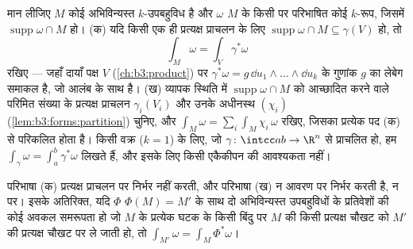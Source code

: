 \begin{definition}[किसी रूप का समाकल]\label{def:b3:forms:integral}
मान लीजिए $M$ कोई अभिविन्यस्त $k$-उपबहुविध है और $\omega$ $M$
के किसी  पर परिभाषित कोई $k$-रूप, जिसमें $\operatorname{supp}\omega \cap M$  हो।
(क) यदि किसी एक ही प्रत्यक्ष प्राचलन के लिए $\operatorname{supp}\omega \cap M \subseteq
\gamma(V)$ हो, तो
\[
\int_M\omega = \int_V\gamma^*\omega
\]
रखिए --- जहाँ दायाँ पक्ष $V$ (\cref{ch:b3:product}) पर $\gamma^*\omega = g\,\dd u_1\wedge\dots\wedge\dd u_k$ के गुणांक $g$
का लेबेग समाकल है, जो  आलंब के साथ  है।
(ख) व्यापक स्थिति में  $\operatorname{supp}\omega \cap M$ को आच्छादित करने वाले परिमित
संख्या के प्रत्यक्ष प्राचलन $\gamma_i(V_i)$ और उनके अधीनस्थ 
$(\chi_i)$ (\cref{lem:b3:forms:partition}) चुनिए, और $\int_M\omega =
\sum_i\int_M\chi_i\,\omega$ रखिए, जिसका प्रत्येक पद (क) से
परिकलित होता है। किसी वक्र ($k = 1$) के लिए, जो $\gamma\colon\intcc ab\to\R^n$ से प्राचलित
हो, हम $\int_\gamma\omega = \int_a^b\gamma^*\omega$ लिखते हैं, और इसके लिए किसी एकैकीपन की आवश्यकता नहीं।
\end{definition}

\begin{lemma}[संगति]\label{lem:b3:forms:consistency}
परिभाषा (क) प्रत्यक्ष प्राचलन पर निर्भर नहीं करती, और परिभाषा (ख)
न आवरण पर निर्भर करती है, न  पर। इसके अतिरिक्त, यदि
$\Phi$ $\Phi(M) = M'$ के साथ दो अभिविन्यस्त उपबहुविधों के प्रतिवेशों की कोई
अवकल समरूपता हो जो $M$ के प्रत्येक घटक के किसी बिंदु पर $M$
की किसी प्रत्यक्ष चौखट को $M'$ की प्रत्यक्ष चौखट पर ले जाती हो,
तो $\int_{M'}\omega =
\int_M\Phi^*\omega$।
\end{lemma}

